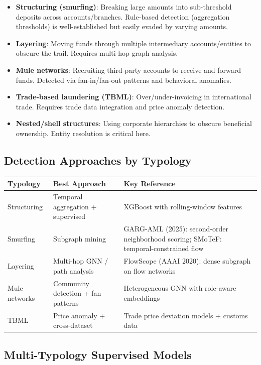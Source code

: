 \documentclass[11pt]{article}
\begin{document}
\begin{itemize}
\item \textbf{Structuring (smurfing)}: Breaking large amounts into sub-threshold deposits across accounts/branches. Rule-based detection (aggregation thresholds) is well-established but easily evaded by varying amounts.
\item \textbf{Layering}: Moving funds through multiple intermediary accounts/entities to obscure the trail. Requires multi-hop graph analysis.
\item \textbf{Mule networks}: Recruiting third-party accounts to receive and forward funds. Detected via fan-in/fan-out patterns and behavioral anomalies.
\item \textbf{Trade-based laundering (TBML)}: Over/under-invoicing in international trade. Requires trade data integration and price anomaly detection.
\item \textbf{Nested/shell structures}: Using corporate hierarchies to obscure beneficial ownership. Entity resolution is critical here.
\end{itemize}

\subsection{Detection Approaches by Typology}

\begin{center}
\small
\begin{tabular}{p{2.5cm}p{4cm}p{5cm}}
\toprule
\textbf{Typology} & \textbf{Best Approach} & \textbf{Key Reference} \\
\midrule
Structuring & Temporal aggregation + supervised & XGBoost with rolling-window features \\
Smurfing & Subgraph mining & GARG-AML (2025): second-order neighborhood scoring; SMoTeF: temporal-constrained flow \\
Layering & Multi-hop GNN / path analysis & FlowScope (AAAI 2020): dense subgraph on flow networks \\
Mule networks & Community detection + fan patterns & Heterogeneous GNN with role-aware embeddings \\
TBML & Price anomaly + cross-dataset & Trade price deviation models + customs data \\
\bottomrule
\end{tabular}
\end{center}

\subsection{Multi-Typology Supervised Models}
\end{document}
